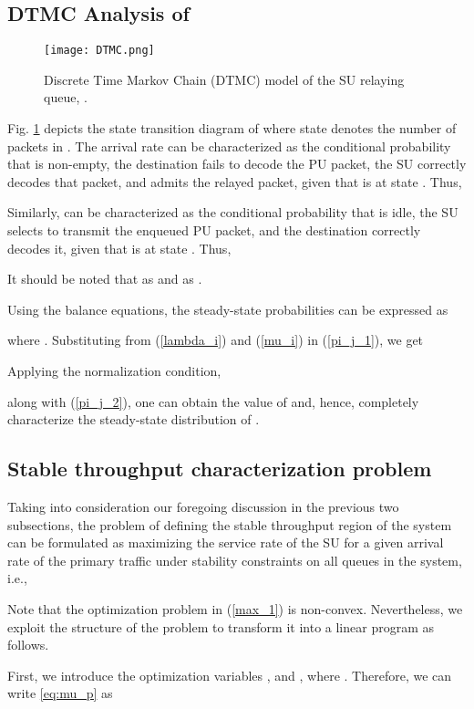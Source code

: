 \documentclass[conference]{IEEEtran}
\begin{document}
\subsection{DTMC Analysis of  }
\begin{figure}
\centering
\texttt{[image: DTMC.png]}
\caption{Discrete Time Markov Chain (DTMC) model of the SU relaying queue, .}
\label{fig:DTMC}
\end{figure}

Fig. \ref{fig:DTMC} depicts the state transition diagram of  where
state  denotes the number of packets in . The
arrival rate  can be characterized as the conditional
probability that  is non-empty, the destination fails to
decode the PU packet, the SU correctly decodes that packet, and
 admits the relayed packet, given that  is at
state . Thus,

Similarly,  can be characterized as the conditional
probability that  is idle, the SU selects  to transmit
the enqueued PU packet, and the destination correctly decodes it, given that
 is at state . Thus,

It should be noted that  as  and  as
.


Using the balance equations, the steady-state probabilities can be expressed as

where . Substituting from (\ref{lambda_i}) and
(\ref{mu_i}) in (\ref{pi_j_1}), we get

Applying the normalization condition,

along with (\ref{pi_j_2}), one can obtain the value of  and, 
hence, completely characterize the steady-state distribution of
.

\subsection{Stable throughput characterization problem}
Taking into consideration our foregoing discussion in the previous
two subsections, the problem of defining the stable throughput
region of the system can be formulated as maximizing the service
rate of the SU for a given arrival rate of the primary
traffic under stability constraints on all queues in the system,
i.e.,

Note that the optimization problem in (\ref{max_1}) is non-convex.
Nevertheless, we exploit the structure of the problem to transform
it into a linear program as follows.

First, we introduce the optimization variables  ,
and , where . Therefore, we
can write \eqref{eq:mu_p} as
\end{document}
